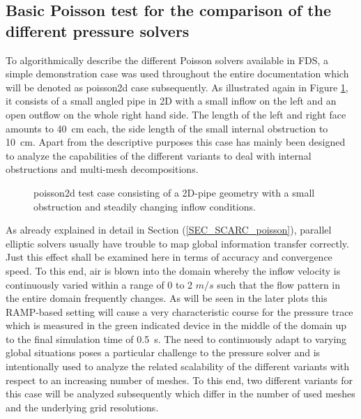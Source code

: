 \subsection{Basic Poisson test for the comparison of the different pressure solvers}
\label{SEC_SCARC_poisson_case}

To algorithmically describe the different Poisson solvers available in FDS, a simple demonstration case was used throughout the entire documentation which will be denoted as {\ct poisson2d} case subsequently. As illustrated again in Figure \ref{FIG_scarc_poisson_geometry}, it consists of a small angled pipe in 2D with a small inflow on the left and an open outflow on the whole right hand side. The length of the left and right face amounts to 40~cm each, the side length of the small internal obstruction to 10~cm.
Apart from the descriptive purposes this case has mainly been designed to analyze the capabilities of the different \scarc{} variants to deal with internal obstructions and multi-mesh decompositions.

\begin{figure}[ht]
\begin{center}

\end{center}
\caption[{\ct poisson2d} test case]{{\ct poisson2d} test case consisting of a 2D-pipe geometry with a small obstruction and steadily changing inflow conditions.}
\label{FIG_scarc_poisson_geometry}
\end{figure}

As already explained in detail in Section (\ref{SEC_SCARC_poisson}), parallel elliptic solvers usually have trouble to map global information transfer correctly. Just this effect shall be examined here in terms of accuracy and convergence speed. 
To this end, air is blown into the domain whereby the inflow velocity is continuously varied within a range of 0 to 2 $m/s$
such that the flow pattern in the entire domain frequently changes. As will be seen in the later plots this RAMP-based setting will cause a very characteristic course for the pressure trace which is measured in the green indicated device in the middle of the domain up to the final simulation time of 0.5~s.
%
The need to continuously adapt to varying global situations poses a particular challenge to the pressure solver and is intentionally used to analyze the related scalability of the different variants with respect to an increasing number of meshes.
To this end, two different variants for this case will be analyzed subsequently which differ in the number of used meshes and the underlying grid resolutions.

